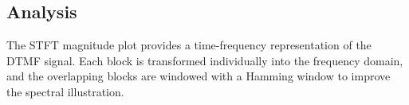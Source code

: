 \subsection*{Analysis}
The STFT magnitude plot provides a time-frequency representation of the DTMF signal. Each block is transformed individually into the frequency domain, and the overlapping blocks are windowed with a Hamming window to improve the spectral illustration.
